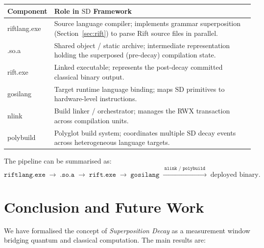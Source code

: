 \documentclass[11pt]{article}
\theoremstyle{plain}
\theoremstyle{definition}
\theoremstyle{remark}
\newcommand{\SD}{\ensuremath{\mathrm{SD}}}   %
\begin{document}
\begin{center}
\renewcommand{\arraystretch}{1.4}
\begin{tabular}{@{}>{\ttfamily}p{3cm}p{9cm}@{}}
  \toprule
  \normalfont\textbf{Component} & \textbf{Role in \SD{} Framework} \\
  \midrule
  riftlang.exe   & Source language compiler; implements grammar superposition
                   (Section~\ref{sec:rift}) to parse Rift source files in
                   parallel. \\
  .so.a          & Shared object / static archive; intermediate representation
                   holding the superposed (pre-decay) compilation state. \\
  rift.exe       & Linked executable; represents the post-decay committed
                   classical binary output. \\
  gosilang       & Target runtime language binding; maps \SD{} primitives to
                   hardware-level instructions. \\
  nlink          & Build linker / orchestrator; manages the RWX transaction
                   across compilation units. \\
  polybuild      & Polyglot build system; coordinates multiple \SD{} decay
                   events across heterogeneous language targets. \\
  \bottomrule
\end{tabular}
\end{center}

The pipeline can be summarised as:
\[
  \texttt{riftlang.exe} \;\to\; \texttt{.so.a} \;\to\; \texttt{rift.exe}
  \;\to\; \texttt{gosilang} \;\xrightarrow{\;\texttt{nlink / polybuild}\;}\;
  \text{deployed binary}.
\]

\section{Conclusion and Future Work}
\label{sec:conclusion}

We have formalised the concept of \emph{Superposition Decay} as a
measurement window bridging quantum and classical computation.  The main
results are:
\end{document}
